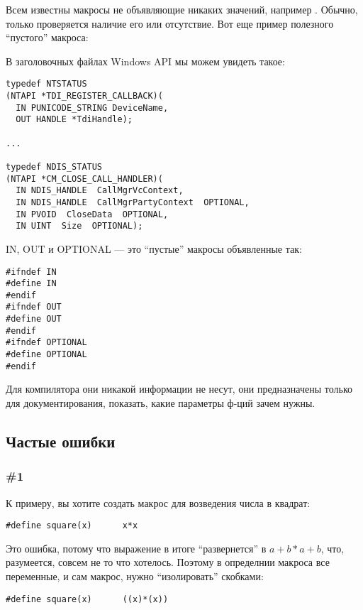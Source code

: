 Всем известны макросы не объявляющие никаких значений, например .
Обычно, только проверяется наличие его или отсутствие.
Вот еще пример полезного ``пустого'' макроса:

В заголовочных файлах Windows API мы можем увидеть такое:

\begin{lstlisting}
typedef NTSTATUS
(NTAPI *TDI_REGISTER_CALLBACK)(
  IN PUNICODE_STRING DeviceName,
  OUT HANDLE *TdiHandle);

...

typedef NDIS_STATUS
(NTAPI *CM_CLOSE_CALL_HANDLER)(
  IN NDIS_HANDLE  CallMgrVcContext,
  IN NDIS_HANDLE  CallMgrPartyContext  OPTIONAL,
  IN PVOID  CloseData  OPTIONAL,
  IN UINT  Size  OPTIONAL);
\end{lstlisting}

IN, OUT и OPTIONAL --- это ``пустые'' макросы объявленные так:

\begin{lstlisting}
#ifndef IN
#define IN
#endif
#ifndef OUT
#define OUT
#endif
#ifndef OPTIONAL
#define OPTIONAL
#endif
\end{lstlisting}

Для компилятора они никакой информации не несут, они предназначены только для документирования, показать,
какие параметры ф-ций зачем нужны.

\subsection{Частые ошибки}

\subsubsection{\#1}

К примеру, вы хотите создать макрос для возведения числа в квадрат:

\begin{lstlisting}
#define square(x)      x*x
\end{lstlisting}

Это ошибка, потому что выражение  в итоге ``развернется'' в $a+b*a+b$, что, разумеется, совсем
не то что хотелось. Поэтому в определнии макроса все переменные, и сам макрос, нужно ``изолировать'' скобками:

\begin{lstlisting}
#define square(x)      ((x)*(x))
\end{lstlisting}

